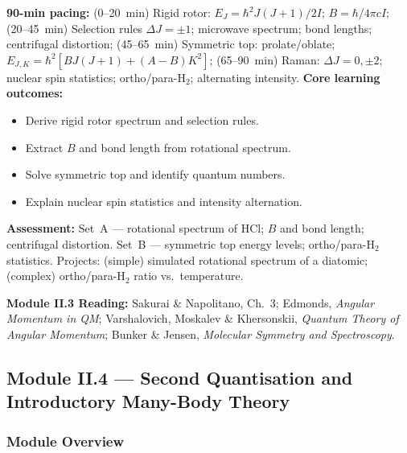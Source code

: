 \documentclass[11pt,a4paper]{article}
\begin{document}
\medskip

\begin{tcolorbox}[modulebox, title={Module~II.3 / L12: Rotational Spectroscopy}]
\textbf{90-min pacing:} (0--20~min) Rigid rotor: $E_J=\hbar^2J(J+1)/2I$; $B=\hbar/4\pi cI$; (20--45~min) Selection rules $\Delta J=\pm1$; microwave spectrum; bond lengths; centrifugal distortion; (45--65~min) Symmetric top: prolate/oblate; $E_{J,K}=\hbar^2[BJ(J+1)+(A-B)K^2]$; (65--90~min) Raman: $\Delta J=0,\pm2$; nuclear spin statistics; ortho/para-H$_2$; alternating intensity.
\medskip\textbf{Core learning outcomes:}
\begin{itemize}[leftmargin=1.4em,topsep=2pt,itemsep=1pt]
  \item Derive rigid rotor spectrum and selection rules.
  \item Extract $B$ and bond length from rotational spectrum.
  \item Solve symmetric top and identify quantum numbers.
  \item Explain nuclear spin statistics and intensity alternation.
\end{itemize}
\medskip\textbf{Assessment:}
Set~A --- rotational spectrum of HCl; $B$ and bond length; centrifugal distortion.
Set~B --- symmetric top energy levels; ortho/para-H$_2$ statistics.
Projects: (simple) simulated rotational spectrum of a diatomic; (complex) ortho/para-H$_2$ ratio vs.\ temperature.
\end{tcolorbox}

\begin{tcolorbox}[highlightbox]
\textbf{Module II.3 Reading:} Sakurai \& Napolitano, Ch.~3; Edmonds, \textit{Angular Momentum in QM}; Varshalovich, Moskalev \& Khersonskii, \textit{Quantum Theory of Angular Momentum}; Bunker \& Jensen, \textit{Molecular Symmetry and Spectroscopy}.
\end{tcolorbox}

\subsection{Module II.4 --- Second Quantisation and Introductory Many-Body Theory}
\label{sec:mod-II4}

\subsubsection*{Module Overview}
\end{document}
